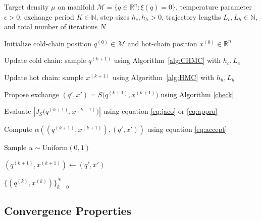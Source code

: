 \documentclass[12pt]{article}
\begin{document}
\begin{algorithm}[htbp]
\caption{Replica Exchange Constrained Hamiltonian Monte Carlo}
\label{alg:ptchmc}
\begin{algorithmic}[1]
\Require Target density $\mu$ on manifold $\mathcal{M}=\{q \in \mathbb{R}^n : \xi(q)=0\}$, temperature parameter $\epsilon>0$, exchange period $K\in\mathbb{N}$, step sizes $h_c,h_h>0$, trajectory lengths $L_c,L_h\in\mathbb{N}$, and total number of iterations $N$

\State Initialize cold-chain position $q^{(0)} \in \mathcal{M}$ and hot-chain position $x^{(0)} \in \mathbb{R}^n$


    \State Update cold chain: sample $q^{(k+1)}$ using Algorithm~\ref{alg:CHMC} with $h_c,L_c$
    
    \State Update hot chain: sample $x^{(k+1)}$ using Algorithm~\ref{alg:HMC} with $h_h,L_h$
    
    
        \State Propose exchange
        \(
        (q', x') = S\big(q^{(k+1)}, x^{(k+1)}\big)
        \) using Algorithm \ref{check}
        
        
            \State Evaluate
            \(
            \left| J_S\big(q^{(k+1)}, x^{(k+1)}\big) \right|
            \)
            using equation \eqref{eq:jaco} or \eqref{eq:appro}
            
            \State Compute
            \(
            \alpha\!\left( (q^{(k+1)}, x^{(k+1)}), (q', x') \right)
            \)
            using equation \eqref{eq:accept}
            
            \State Sample $u \sim \mathrm{Uniform}(0,1)$
            
                \State
                \(
                (q^{(k+1)}, x^{(k+1)}) \leftarrow (q', x')
                \)
            \EndIf
            
        \EndIf
        
    \EndIf

\EndFor

\Return $\{(q^{(k)},x^{(k)})\}_{k=0}^{N}$
\end{algorithmic}
\end{algorithm}

\subsection{Convergence Properties}
\end{document}
